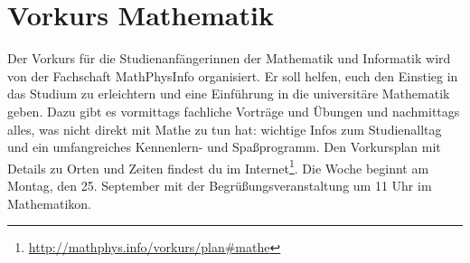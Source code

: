 \section{Vorkurs Mathematik}
Der Vorkurs für die Studienanfängerinnen der Mathematik und Informatik wird von der Fachschaft MathPhysInfo organisiert. Er soll helfen, euch den Einstieg in das Studium zu erleichtern und eine Einführung in die universitäre Mathematik geben. Dazu gibt es vormittags fachliche Vorträge und Übungen und nachmittags alles, was nicht direkt mit Mathe zu tun hat: wichtige Infos zum Studienalltag und ein umfangreiches Kennenlern- und Spaßprogramm. Den Vorkursplan mit Details zu Orten und Zeiten findest du im Internet\footnote{\url{http://mathphys.info/vorkurs/plan\#mathe}}. Die Woche beginnt am Montag, den 25. September mit der Begrüßungsveranstaltung um 11 Uhr im \gls{Mathematikon}.
